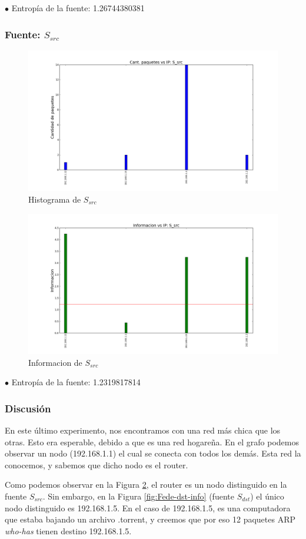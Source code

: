 $\bullet$ Entropía de la fuente: 1.26744380381

\subsubsection{Fuente: $S_{src}$}

\begin{figure}[H]\centering
    \includegraphics[width=0.8\linewidth]{../imgs/red-hogarena_S_src_hist.png}
    \caption{Histograma de $S_{src}$}\label{fig:Fede-src-hist}
\end{figure}

\begin{figure}[H]\centering
    \includegraphics[width=0.8\linewidth]{../imgs/red-hogarena_S_src_info.png}
    \caption{Informacion de $S_{src}$}\label{fig:Fede-src-info}
\end{figure}

$\bullet$ Entropía de la fuente: 1.2319817814

\subsubsection{Discusión}

En este último experimento, nos encontramos con una red más chica que los otras. Esto era esperable, debido a que es una red hogareña. En el grafo podemos observar un nodo (192.168.1.1) el cual se conecta con todos los demás. Esta red la conocemos, y sabemos que dicho nodo es el router.

Como podemos observar en la Figura \ref{fig:Fede-src-info}, el router es un nodo distinguido en la fuente $S_{src}$. Sin embargo, en la Figura \ref{fig:Fede-dst-info} (fuente $S_{dst}$) el único nodo distinguido es 192.168.1.5. En el caso de 192.168.1.5, es una computadora que estaba bajando un archivo .torrent, y creemos que por eso 12 paquetes ARP \emph{who-has} tienen destino 192.168.1.5.